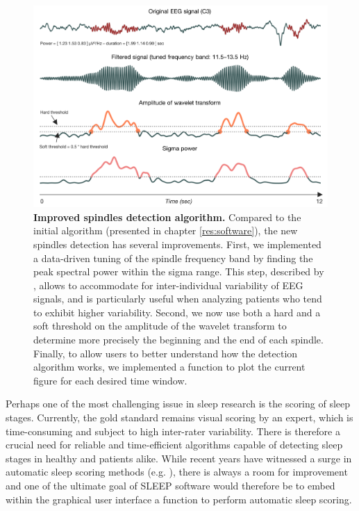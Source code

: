 \begin{figure}[htb]
	\includegraphics[width=\textwidth]{Fig/Discussion/spindles.png}
	\caption[Improved spindles detection algorithm]{\textbf{Improved spindles detection algorithm.} Compared to the initial algorithm (presented in chapter \ref{res:software}), the new spindles detection has several improvements. First, we implemented a data-driven tuning of the spindle frequency band by finding the peak spectral power within the sigma range. This step, described by \citet{berthomier_automatic_2007}, allows to accommodate for inter-individual variability of EEG signals, and is particularly useful when analyzing patients who tend to exhibit higher variability. Second, we now use both a hard and a soft threshold on the amplitude of the wavelet transform to determine more precisely the beginning and the end of each spindle. Finally, to allow users to better understand how the detection algorithm works, we implemented a function to plot the current figure for each desired time window.}
	\label{fig:disc:methods:future:spindles}
\end{figure}

Perhaps one of the most challenging issue in sleep research is the scoring of sleep stages. Currently, the gold standard remains visual scoring by an expert, which is time-consuming and subject to high inter-rater variability. There is therefore a crucial need for reliable and time-efficient algorithms capable of detecting sleep stages in healthy and patients alike. While recent years have witnessed a surge in automatic sleep scoring methods (e.g. \citealp{berthomier_automatic_2007, lajnef_learning_2015}), there is always a room for improvement and one of the ultimate goal of SLEEP software would therefore be to embed within the graphical user interface a function to perform automatic sleep scoring.


